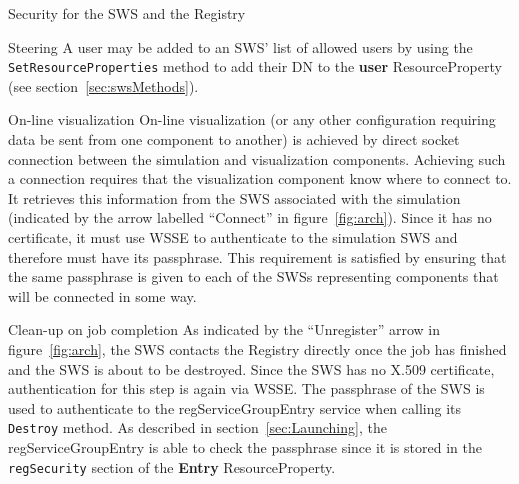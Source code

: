 \documentclass[a4paper]{article}
\begin{document}
\begin{section}{Security for the SWS and the Registry}
\begin{subsection}{Steering}
A user may be added to an SWS' list of allowed users by using the 
\texttt{SetResourceProperties} method to add their DN to the {\bf user}
ResourceProperty (see section~\ref{sec:swsMethods}).
\end{subsection}

\begin{subsection}{On-line visualization}
On-line visualization (or any other configuration requiring data be sent from one
component to another) is achieved by direct socket connection between the 
simulation and visualization components.  Achieving such a connection requires
that the visualization component know where to connect to.  It retrieves this
information from the SWS associated with the simulation (indicated by the arrow labelled ``Connect'' in figure~\ref{fig:arch}).  Since it has no
certificate, it must use WSSE to authenticate to the simulation SWS and therefore
must have its passphrase.  This requirement is satisfied by ensuring that the same 
passphrase is given to each of the SWSs representing components that will be 
connected in some way.
\end{subsection} 

\begin{subsection}{Clean-up on job completion}
As indicated by the ``Unregister'' arrow in figure~\ref{fig:arch}, the SWS contacts
the Registry directly once the job has finished and the SWS is about to be destroyed.
Since the SWS has no X.509 certificate, authentication for this step is again via
WSSE.  The passphrase of the SWS is used to authenticate to the regServiceGroupEntry
service when calling its \texttt{Destroy} method.  As described in 
section~\ref{sec:Launching}, the
regServiceGroupEntry is able to check the passphrase since it is stored in the
\texttt{regSecurity} section of the {\bf Entry} ResourceProperty.
\end{subsection}

\end{section}
\end{document}
